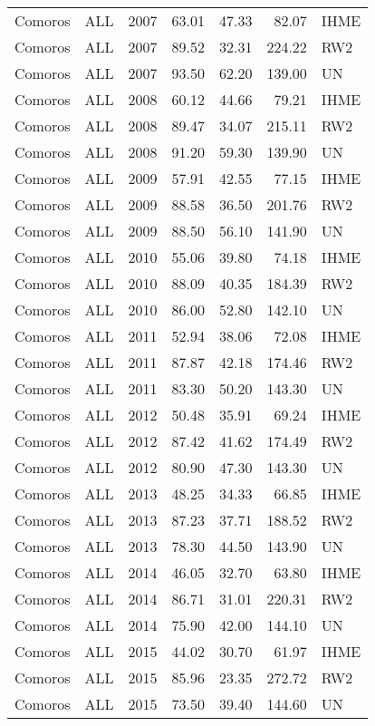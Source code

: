 \begin{longtable}{lllrrrl}
  Comoros & ALL & 2007 & 63.01 & 47.33 & 82.07 & IHME \\ 
  Comoros & ALL & 2007 & 89.52 & 32.31 & 224.22 & RW2 \\ 
  Comoros & ALL & 2007 & 93.50 & 62.20 & 139.00 & UN \\ 
  Comoros & ALL & 2008 & 60.12 & 44.66 & 79.21 & IHME \\ 
  Comoros & ALL & 2008 & 89.47 & 34.07 & 215.11 & RW2 \\ 
  Comoros & ALL & 2008 & 91.20 & 59.30 & 139.90 & UN \\ 
  Comoros & ALL & 2009 & 57.91 & 42.55 & 77.15 & IHME \\ 
  Comoros & ALL & 2009 & 88.58 & 36.50 & 201.76 & RW2 \\ 
  Comoros & ALL & 2009 & 88.50 & 56.10 & 141.90 & UN \\ 
  Comoros & ALL & 2010 & 55.06 & 39.80 & 74.18 & IHME \\ 
  Comoros & ALL & 2010 & 88.09 & 40.35 & 184.39 & RW2 \\ 
  Comoros & ALL & 2010 & 86.00 & 52.80 & 142.10 & UN \\ 
  Comoros & ALL & 2011 & 52.94 & 38.06 & 72.08 & IHME \\ 
  Comoros & ALL & 2011 & 87.87 & 42.18 & 174.46 & RW2 \\ 
  Comoros & ALL & 2011 & 83.30 & 50.20 & 143.30 & UN \\ 
  Comoros & ALL & 2012 & 50.48 & 35.91 & 69.24 & IHME \\ 
  Comoros & ALL & 2012 & 87.42 & 41.62 & 174.49 & RW2 \\ 
  Comoros & ALL & 2012 & 80.90 & 47.30 & 143.30 & UN \\ 
  Comoros & ALL & 2013 & 48.25 & 34.33 & 66.85 & IHME \\ 
  Comoros & ALL & 2013 & 87.23 & 37.71 & 188.52 & RW2 \\ 
  Comoros & ALL & 2013 & 78.30 & 44.50 & 143.90 & UN \\ 
  Comoros & ALL & 2014 & 46.05 & 32.70 & 63.80 & IHME \\ 
  Comoros & ALL & 2014 & 86.71 & 31.01 & 220.31 & RW2 \\ 
  Comoros & ALL & 2014 & 75.90 & 42.00 & 144.10 & UN \\ 
  Comoros & ALL & 2015 & 44.02 & 30.70 & 61.97 & IHME \\ 
  Comoros & ALL & 2015 & 85.96 & 23.35 & 272.72 & RW2 \\ 
  Comoros & ALL & 2015 & 73.50 & 39.40 & 144.60 & UN \\ 

\end{longtable}
